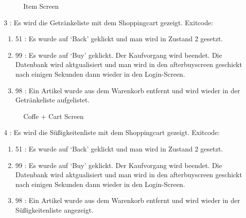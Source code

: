 \documentclass[11pt,a4paper]{article} %
\begin{document}
\newpage
\begin{figure}[h]
	\caption{Item Screen}
	\end{figure}		
		3 : Es wird die Getränkeliste mit dem Shoppingcart gezeigt.
			Exitcode:
\begin{enumerate}			
			\item	51 : Es wurde auf `Back' geklickt und man wird in Zustand 2 gesetzt.
			\item	99 : Es wurde auf `Buy' geklickt. Der Kaufvorgang wird beendet. Die Datenbank wird aktgualisiert und man wird in den afterbuyscreen geschickt nach einigen 						Sekunden dann wieder in den Login-Screen.
			\item	98 : Ein Artikel wurde aus dem Warenkorb entfernt und wird wieder in der Getränkeliste aufgelistet.
\end{enumerate}
\begin{figure}[h]
	\caption{Coffe + Cart Screen}
	\end{figure}			
		4 : Es wird die Süßigkeitenliste mit dem Shoppingcart gezeigt. 
			Exitcode:
\begin{enumerate}			
			\item	51 : Es wurde auf `Back' geklickt und man wird in Zustand 2 gesetzt.
			\item	99 : Es wurde auf `Buy' geklickt. Der Kaufvorgang wird beendet. Die Datenbank wird aktgualisiert und man wird in den afterbuyscreen geschickt nach einigen 						Sekunden dann wieder in den Login-Screen.
			\item	98 : Ein Artikel wurde aus dem Warenkorb entfernt und wird wieder in der Süßigkeitenliste angezeigt.
\end{enumerate}	
\end{document}
